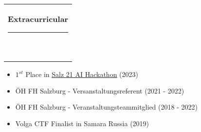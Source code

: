 \documentclass[10pt,A4]{article}
\newcommand{\mpwidth}{\linewidth-\fboxsep-\fboxsep}
\newcommand{\cvtext}[1] {
	\begin{tabular*}{1\mpwidth}{p{0.98\mpwidth}}
		\parbox{1\mpwidth}{#1}
	\end{tabular*}
}
\newcommand{\cvsection}[1] {
	\vspace{14pt}
	\cvtext{
		\textbf{\LARGE{\textcolor{darkcol}{#1}}}\\[-4pt]
		\textcolor{maincol}{ \rule{0.1\textwidth}{2pt} } \\
	}
}
\begin{document}
\begin{paracol}{2}
\begin{rightcolumn}
\vfill\null
\cvsection{Extracurricular}
\vspace{-0.3cm}
\begin{itemize}
	\item $1^{st}$ Place in \href{https://www.fh-salzburg.ac.at/en/about-fh-salzburg/news-and-events/news?tx_news_pi1%5Baction%5D=detail&tx_news_pi1%5Bcontroller%5D=News&tx_news_pi1%5Bnews%5D=4120&cHash=62d1ec8864492e7b9b17af9e60e6c6c3}{\underline{Salz 21 AI Hackathon}} (2023)
  \item ÖH FH Salzburg - Versanstaltungsreferent (2021 - 2022)
  \item ÖH FH Salzburg - Veranstaltungsteammitglied (2018 - 2022)
  \item Volga CTF Finalist in Samara Russia (2019)
\end{itemize}
\vfill\null


\vfill
\vfill
\vfill
\end{rightcolumn}
\end{paracol}
\end{document}
